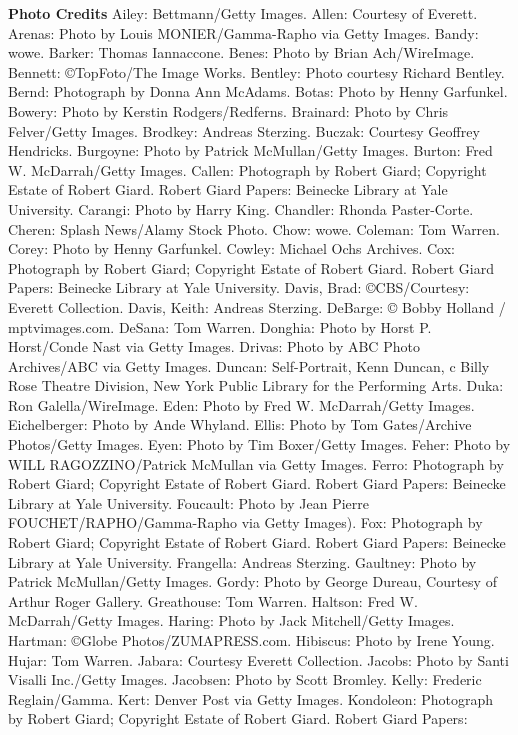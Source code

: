 \textbf{Photo Credits} Ailey: Bettmann/Getty Images. Allen: Courtesy of
Everett. Arenas: Photo by Louis MONIER/Gamma-Rapho via Getty Images.
Bandy: wowe. Barker: Thomas Iannaccone. Benes: Photo by Brian
Ach/WireImage. Bennett: ©TopFoto/The Image Works. Bentley: Photo
courtesy Richard Bentley. Bernd: Photograph by Donna Ann McAdams. Botas:
Photo by Henny Garfunkel. Bowery: Photo by Kerstin Rodgers/Redferns.
Brainard: Photo by Chris Felver/Getty Images. Brodkey: Andreas Sterzing.
Buczak: Courtesy Geoffrey Hendricks. Burgoyne: Photo by Patrick
McMullan/Getty Images. Burton: Fred W. McDarrah/Getty Images. Callen:
Photograph by Robert Giard; Copyright Estate of Robert Giard. Robert
Giard Papers: Beinecke Library at Yale University. Carangi: Photo by
Harry King. Chandler: Rhonda Paster-Corte. Cheren: Splash News/Alamy
Stock Photo. Chow: wowe. Coleman: Tom Warren. Corey: Photo by Henny
Garfunkel. Cowley: Michael Ochs Archives. Cox: Photograph by Robert
Giard; Copyright Estate of Robert Giard. Robert Giard Papers: Beinecke
Library at Yale University. Davis, Brad: ©CBS/Courtesy: Everett
Collection. Davis, Keith: Andreas Sterzing. DeBarge: © Bobby Holland /
mptvimages.com. DeSana: Tom Warren. Donghia: Photo by Horst P.
Horst/Conde Nast via Getty Images. Drivas: Photo by ABC Photo
Archives/ABC via Getty Images. Duncan: Self-Portrait, Kenn Duncan, c
Billy Rose Theatre Division, New York Public Library for the Performing
Arts. Duka: Ron Galella/WireImage. Eden: Photo by Fred W. McDarrah/Getty
Images. Eichelberger: Photo by Ande Whyland. Ellis: Photo by Tom
Gates/Archive Photos/Getty Images. Eyen: Photo by Tim Boxer/Getty
Images. Feher: Photo by WILL RAGOZZINO/Patrick McMullan via Getty
Images. Ferro: Photograph by Robert Giard; Copyright Estate of Robert
Giard. Robert Giard Papers: Beinecke Library at Yale University.
Foucault: Photo by Jean Pierre FOUCHET/RAPHO/Gamma-Rapho via Getty
Images). Fox: Photograph by Robert Giard; Copyright Estate of Robert
Giard. Robert Giard Papers: Beinecke Library at Yale University.
Frangella: Andreas Sterzing. Gaultney: Photo by Patrick McMullan/Getty
Images. Gordy: Photo by George Dureau, Courtesy of Arthur Roger Gallery.
Greathouse: Tom Warren. Haltson: Fred W. McDarrah/Getty Images. Haring:
Photo by Jack Mitchell/Getty Images. Hartman: ©Globe
Photos/ZUMAPRESS.com. Hibiscus: Photo by Irene Young. Hujar: Tom Warren.
Jabara: Courtesy Everett Collection. Jacobs: Photo by Santi Visalli
Inc./Getty Images. Jacobsen: Photo by Scott Bromley. Kelly: Frederic
Reglain/Gamma. Kert: Denver Post via Getty Images. Kondoleon: Photograph
by Robert Giard; Copyright Estate of Robert Giard. Robert Giard Papers:
